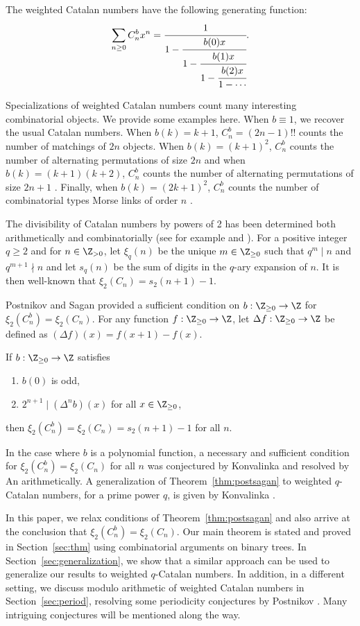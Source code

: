 \begin{proposition}
\label{prop:genfunc}
The weighted Catalan numbers have the following generating function:
\[\sum_{n\geq0}C_n^bx^n=\cfrac{1}{1-\cfrac{b(0)x}{1-\cfrac{b(1)x}{1-\cfrac{b(2)x}{1-\cdots}}}}.\]
\end{proposition}
Specializations of weighted Catalan numbers count many interesting combinatorial objects. We provide some examples here. When $b\equiv1$, we recover the usual Catalan numbers. When $b(k)=k+1$, $C_n^b=(2n-1)!!$ counts the number of matchings of $2n$ objects. When $b(k)=(k+1)^2$, $C_n^b$ counts the number of alternating permutations of size $2n$ and when $b(k)=(k+1)(k+2)$, $C_n^b$ counts the number of alternating permutations of size $2n+1$ \cite{goulden2004combinatorial}. Finally, when $b(k)=(2k+1)^2$, $C_n^b$ counts the number of combinatorial types Morse links of order $n$ \cite{postnikov2000morse}.

The divisibility of Catalan numbers by powers of 2 has been determined both arithmetically and combinatorially (see for example \cite{dickson1966history} and \cite{deutsch2006congruences}). For a positive integer $q\geq2$ and for $n\in\Z_{>0}$, let $\xi_q(n)$ be the unique $m\in\Z_{\geq0}$ such that $q^m\mid n$ and $q^{m+1}\nmid n$ and let $s_q(n)$ be the sum of digits in the $q$-ary expansion of $n$. It is then well-known that $\xi_2(C_n)=s_2(n+1)-1$.

Postnikov and Sagan \cite{postnikov2007power} provided a sufficient condition on $b:\Z_{\geq0}\rightarrow\Z$ for $\xi_2(C_n^b)=\xi_2(C_n)$. For any function $f:\Z_{\geq0}\rightarrow\Z$, let $\Delta f:\Z_{\geq0}\rightarrow\Z$ be defined as $(\Delta f)(x)=f(x+1)-f(x)$.
\begin{theorem}\label{thm:postsagan}
If $b:\Z_{\geq0}\rightarrow\Z$ satisfies
\begin{enumerate}
    \item $b(0)$ is odd,
    \item $2^{n+1}\mid(\Delta^nb)(x)$ for all $x\in\Z_{\geq0}$,
\end{enumerate}
then $\xi_2(C_n^b)=\xi_2(C_n)=s_2(n+1)-1$ for all $n$.
\end{theorem}
In the case where $b$ is a polynomial function, a necessary and sufficient condition for $\xi_2(C_n^b)=\xi_2(C_n)$ for all $n$ was conjectured by Konvalinka \cite{konvalinka2007divisibility} and resolved by An \cite{an2010combinatorial} arithmetically. A generalization of Theorem~\ref{thm:postsagan} to weighted $q$-Catalan numbers, for a prime power $q$, is given by Konvalinka \cite{konvalinka2007divisibility}.

In this paper, we relax conditions of Theorem~\ref{thm:postsagan} and also arrive at the conclusion that $\xi_2(C_n^b)=\xi_2(C_n)$. Our main theorem is stated and proved in Section~\ref{sec:thm} using combinatorial arguments on binary trees. In Section~\ref{sec:generalization}, we show that a similar approach can be used to generalize our results to weighted $q$-Catalan numbers. In addition, in a different setting, we discuss modulo arithmetic of weighted Catalan numbers in Section~\ref{sec:period}, resolving some periodicity conjectures by Postnikov \cite{postnikov2000morse}. Many intriguing conjectures will be mentioned along the way.

